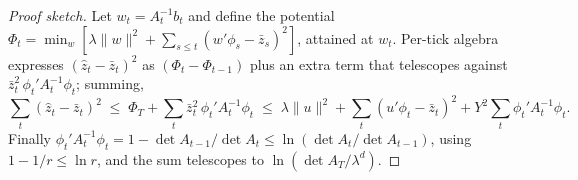 \documentclass[article]{jss}
\theoremstyle{remark}
\begin{document}
\begin{proof}[Proof sketch]
Let $w_t = A_t^{-1} b_t$ and define the potential $\Phi_t = \min_w
[\lambda\|w\|^2 + \sum_{s\le t}(w'\phi_s - \bar z_s)^2]$, attained at $w_t$.
Per-tick algebra expresses $(\hat z_t - \bar z_t)^2$ as $(\Phi_t -
\Phi_{t-1})$ plus an extra term that telescopes against $\bar z_t^2\,
\phi_t'A_t^{-1}\phi_t$; summing,
\[
\sum_t (\hat z_t - \bar z_t)^2 \;\le\; \Phi_T + \sum_t \bar z_t^2\, \phi_t'
A_t^{-1} \phi_t \;\le\; \lambda\|u\|^2 + \sum_t (u'\phi_t - \bar z_t)^2 + Y^2
\sum_t \phi_t' A_t^{-1} \phi_t.
\]
Finally $\phi_t' A_t^{-1} \phi_t = 1 - \det A_{t-1}/\det A_t \le \ln(\det
A_t/\det A_{t-1})$, using $1 - 1/r \le \ln r$, and the sum telescopes to
$\ln(\det A_T/\lambda^d)$.
\end{proof}



\end{document}
